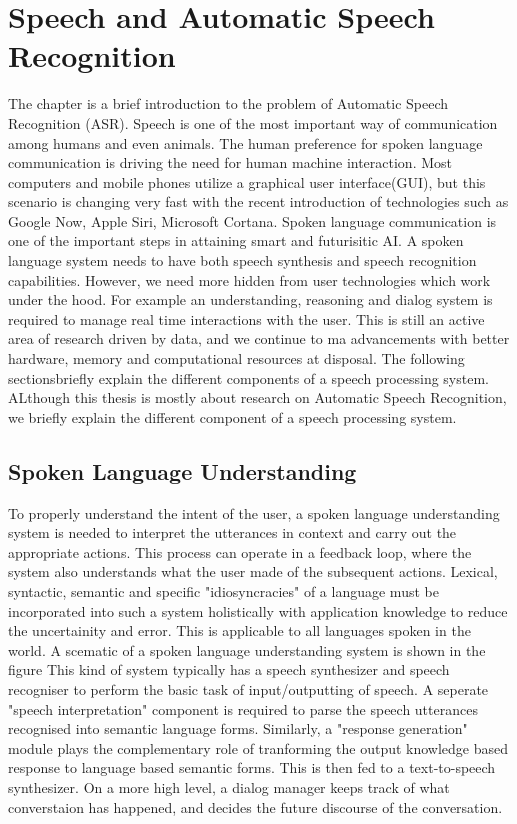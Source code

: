 \documentclass[a4paper,11pt]{kth-mag}
\begin{document}
\chapter{Speech and Automatic Speech Recognition}
The chapter is a brief introduction to the problem of Automatic Speech Recognition
(ASR). Speech is one of the most important way of communication among humans and 
even animals. The human preference for spoken language communication is driving the need for
human machine interaction. Most computers and mobile phones utilize a graphical
user interface(GUI), but this scenario is changing very fast with the
recent introduction of technologies such as Google Now, Apple Siri,
Microsoft Cortana. Spoken language communication is one of the important 
steps in attaining smart and futurisitic AI. A spoken language system needs
to have both speech synthesis and speech recognition capabilities. However, we
need more hidden from user technologies which work under the hood. For example an
understanding, reasoning and dialog system is required to manage real time
interactions with the user. This is still an active area of research driven by data, and we continue to ma
advancements with better hardware, memory and computational resources at disposal. The following sectionsbriefly explain
the different components of a speech processing system. ALthough this thesis is mostly about research on Automatic 
Speech Recognition, we briefly explain the different component of a speech processing system.
\section{Spoken Language Understanding}
To properly understand the intent of the user, a spoken language understanding
system is needed to interpret the utterances in context and carry out the
appropriate actions. This process can operate in a feedback loop, where
the system also understands what the user made of the subsequent actions.
Lexical, syntactic, semantic and specific "idiosyncracies" of a language
must be incorporated into such a system holistically with application knowledge
to reduce the uncertainity and error. This is applicable to all languages spoken
in the world.
A scematic of a spoken language understanding system is shown in the figure
This kind of system typically has a speech synthesizer and speech recogniser to
perform the basic task of input/outputting of speech. A seperate "speech interpretation"
component is required to parse the speech utterances recognised into semantic language
forms. Similarly, a "response generation" module plays the complementary role of 
tranforming the output knowledge based response to language based semantic forms.
This is then fed to a text-to-speech synthesizer. On a more high level, a dialog manager
keeps track of what converstaion has happened, and decides the future discourse of the
conversation.   
\end{document}
